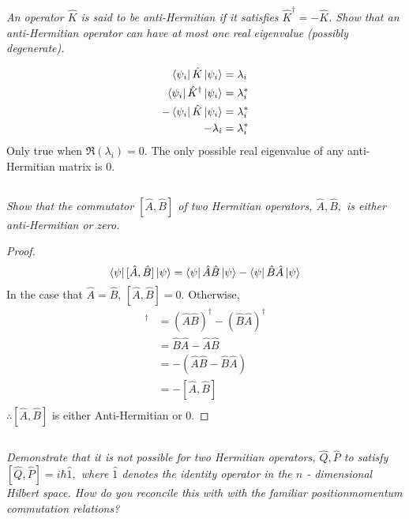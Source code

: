 \documentclass[12pt, letterpaper]{article}
\begin{document}
\subsection{}
\textit{An operator $\hat{K}$ is said to be anti-Hermitian if it satisfies $\hat{K}^{\dagger}=-\hat{K}$. Show that an anti-Hermitian operator can have at most one real eigenvalue (possibly degenerate).}

\begin{align*}
    \bra{\psi_i} \hat K \ket{\psi_i} &= \lambda_i \\
    \bra{\psi_i} \hat{K}^\dagger \ket{\psi_i} &= \lambda_i^* \\
    -\bra{\psi_i} \hat{K} \ket{\psi_i} &= \lambda_i^* \\
    -\lambda_i &= \lambda_i^* \\
\end{align*}
Only true when $\Re\left(\lambda_i\right)= 0$. The only possible real eigenvalue of any anti-Hermitian matrix is 0. 

\subsection{}
\textit{Show that the commutator $[\hat{A}, \hat{B}]$ of two Hermitian operators, $\hat{A}, \hat{B},$ is either anti-Hermitian or zero.}
\begin{proof}
$$
\bra \psi [\hat{A}, \hat{B}] \ket \psi = \bra \psi \hat{A}\hat{B} \ket \psi -\bra \psi \hat{B}\hat{A} \ket \psi 
$$
In the case that $\hat{A}= \hat{B}$, $[\hat{A}, \hat{B}] = 0$. Otherwise, 
\begin{align*}
    [\hat{A}, \hat{B}]^\dagger &= \left(\hat A \hat B \right)^\dagger - \left(\hat B \hat A \right)^\dagger \\
    &=\hat B \hat A -\hat A \hat B\\
    &=-\left(\hat A \hat B-\hat B \hat A  \right)\\
    &= - [\hat{A}, \hat{B}]\\
\end{align*}
$\therefore [\hat{A}, \hat{B}]$ is either Anti-Hermitian or 0.  
\end{proof}

\subsection{}
\textit{Demonstrate that it is not possible for two Hermitian operators, $\hat{Q}, \hat{P}$ to satisfy $[\hat{Q}, \hat{P}]=i \hbar \hat{1},$ where $\hat{1}$ denotes the identity operator in the $n$ - dimensional Hilbert space. How do you reconcile this with with the familiar positionmomentum commutation relations?}
\end{document}
